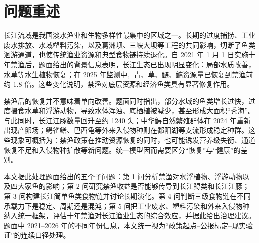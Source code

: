 
\section{问题重述}
长江流域是我国淡水渔业和生物多样性最集中的区域之一。长期的过度捕捞、工业废水排放、水域塑料污染，以及葛洲坝、三峡大坝等工程的共同影响，切断了鱼类洄游通道，也使传统渔业资源和典型食物链持续退化。自 2021 年 1 月 1 日实施十年禁渔后，题面给出的背景信息表明，长江生态已出现明显变化：局部水质改善，水草等水生植物恢复；在 2025 年监测中，青、草、鲢、鳙资源量已恢复到禁渔前约 1.8 倍。这些变化说明，禁渔对底层资源和经济鱼类具有显著修复作用。

禁渔后的恢复并不意味着单向改善。题面同时指出，部分水域的鱼类增长过快，过度摄食水草和浮游动物，导致水体浑浊、底栖植被减少，甚至形成大面积“秃海”。与此同时，长江江豚数量回升至约 1240 头；中华鲟自然繁殖群体在 2024 年重新出现产卵场；鳄雀鳝、巴西龟等外来入侵物种则在鄱阳湖等支流形成稳定种群。这些现象可概括为：禁渔政策在推动资源恢复的同时，也可能诱发营养级失衡、通道恢复不足和入侵物种扩散等新问题。统一模型因而需要区分“恢复”与“健康”的差别\cite{report2022,report2023}。

本文据此处理题面给出的五个子问题：第 1 问分析禁渔对水浮植物、浮游动物以及四大家鱼的影响；第 2 问研究禁渔收益是否能够传导到长江鲟类和长江江豚；第 3 问构建长江简单鱼类食物链并讨论长期演化。第 4 问判断三级食物链在不同承载力下是稳定、周期还是混沌；第 5 问把工业废水、塑料污染和外来入侵物种纳入统一框架，评估十年禁渔对长江渔业生态的综合效应，并据此给出治理建议。题面中 2021--2026 年的不同年份信息，本文统一视为“政策起点--公报标定--现实验证”的连续口径处理\cite{yangtzeA}。
